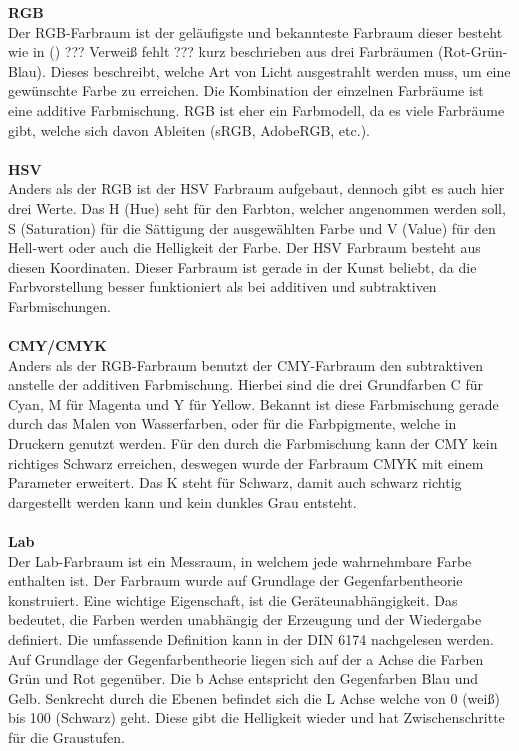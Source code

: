 \documentclass[a4paper,12pt,oneside]{article}
\begin{document}
  \textbf{RGB}\label{s.rgb}\\
  Der RGB-Farbraum ist der geläufigste und bekannteste Farbraum dieser besteht wie in () ??? Verweiß fehlt ??? kurz beschrieben aus drei Farbräumen (Rot-Grün-Blau). Dieses beschreibt, welche Art von Licht ausgestrahlt werden muss, um eine gewünschte Farbe zu erreichen. Die Kombination der einzelnen Farbräume ist eine additive Farbmischung. RGB ist eher ein Farbmodell, da es viele Farbräume gibt, welche sich davon Ableiten (sRGB, AdobeRGB, etc.).\\\\
  \textbf{HSV}\label{s.hsv}\\
  Anders als der RGB ist der HSV Farbraum aufgebaut, dennoch gibt es auch hier drei Werte. Das H (Hue) seht für den Farbton, welcher angenommen werden soll, S (Saturation) für die Sättigung der ausgewählten Farbe und V (Value) für den Hell-wert oder auch die Helligkeit der Farbe. Der HSV Farbraum besteht aus diesen Koordinaten. Dieser Farbraum ist gerade in der Kunst beliebt, da die Farbvorstellung besser funktioniert als bei additiven und subtraktiven Farbmischungen.\\\\
  \textbf{CMY/CMYK}\label{s.cmy}\\
  Anders als der RGB-Farbraum benutzt der CMY-Farbraum den subtraktiven anstelle der additiven Farbmischung. Hierbei sind die drei Grundfarben C für Cyan, M für Magenta und Y für Yellow. Bekannt ist diese Farbmischung gerade durch das Malen von Wasserfarben, oder für die Farbpigmente, welche in Druckern genutzt werden. Für den durch die Farbmischung kann der CMY kein richtiges Schwarz erreichen, deswegen wurde der Farbraum CMYK mit einem Parameter erweitert. Das K steht für Schwarz, damit auch schwarz richtig dargestellt werden kann und kein dunkles Grau entsteht.\\\\
  \textbf{Lab}\label{s.lab}\\
  Der Lab-Farbraum ist ein Messraum, in welchem jede wahrnehmbare Farbe enthalten ist. Der Farbraum wurde auf Grundlage der Gegenfarbentheorie konstruiert. Eine wichtige Eigenschaft, ist die Geräteunabhängigkeit. Das bedeutet, die Farben werden unabhängig der Erzeugung und der Wiedergabe definiert. Die umfassende Definition kann in der DIN 6174 nachgelesen werden. Auf Grundlage der Gegenfarbentheorie liegen sich auf der a Achse die Farben Grün und Rot gegenüber. Die b Achse entspricht den Gegenfarben Blau und Gelb. Senkrecht durch die Ebenen befindet sich die L Achse welche von 0 (weiß) bis 100 (Schwarz) geht. Diese gibt die Helligkeit wieder und hat Zwischenschritte für die Graustufen.
\end{document}
